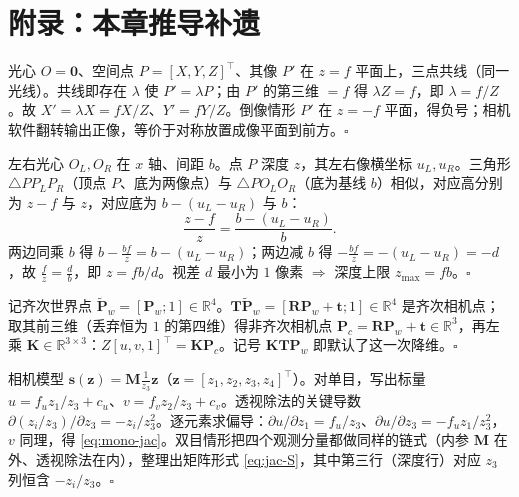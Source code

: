 \section*{附录：本章推导补遗}
\label{sec:cam-appendix}

\begin{derivation}
光心 $O=\mathbf{0}$、空间点 $P=[X,Y,Z]^\top$、其像 $P'$ 在 $z=f$ 平面上，三点共线（同一光线）。共线即存在 $\lambda$ 使 $P'=\lambda P$；由 $P'$ 的第三维 $=f$ 得 $\lambda Z=f$，即 $\lambda=f/Z$。故 $X'=\lambda X=fX/Z$、$Y'=fY/Z$。倒像情形 $P'$ 在 $z=-f$ 平面，得负号；相机软件翻转输出正像，等价于对称放置成像平面到前方。\hfill$\square$
\end{derivation}

\begin{derivation}[双目深度 $z=fb/d$（\cref{thm:stereo}）]
左右光心 $O_L,O_R$ 在 $x$ 轴、间距 $b$。点 $P$ 深度 $z$，其左右像横坐标 $u_L,u_R$。三角形 $\triangle PP_LP_R$（顶点 $P$、底为两像点）与 $\triangle PO_LO_R$（底为基线 $b$）相似，对应高分别为 $z-f$ 与 $z$，对应底为 $b-(u_L-u_R)$ 与 $b$：
\[
  \frac{z-f}{z}=\frac{b-(u_L-u_R)}{b}.
\]
两边同乘 $b$ 得 $b-\tfrac{bf}{z}=b-(u_L-u_R)$；两边减 $b$ 得 $-\tfrac{bf}{z}=-(u_L-u_R)=-d$，故 $\tfrac{f}{z}=\tfrac{d}{b}$，即 $z=fb/d$。视差 $d$ 最小为 $1$ 像素 $\Rightarrow$ 深度上限 $z_{\max}=fb$。\hfill$\square$
\end{derivation}

\begin{derivation}
记齐次世界点 $\tilde{\mathbf{P}}_w=[\mathbf{P}_w;1]\in\mathbb{R}^4$。$\mathbf{T}\tilde{\mathbf{P}}_w=[\mathbf{R}\mathbf{P}_w+\mathbf{t};1]\in\mathbb{R}^4$ 是齐次相机点；取其前三维（丢弃恒为 $1$ 的第四维）得非齐次相机点 $\mathbf{P}_c=\mathbf{R}\mathbf{P}_w+\mathbf{t}\in\mathbb{R}^3$，再左乘 $\mathbf{K}\in\mathbb{R}^{3\times3}$：$Z[u,v,1]^\top=\mathbf{K}\mathbf{P}_c$。记号 $\mathbf{K}\mathbf{T}\mathbf{P}_w$ 即默认了这一次降维。\hfill$\square$
\end{derivation}

\begin{derivation}
相机模型 $\mathbf{s}(\mathbf{z})=\mathbf{M}\tfrac1{z_3}\mathbf{z}$（$\mathbf{z}=[z_1,z_2,z_3,z_4]^\top$）。对单目，写出标量 $u=f_u z_1/z_3+c_u$、$v=f_v z_2/z_3+c_v$。透视除法的关键导数 $\partial(z_i/z_3)/\partial z_3=-z_i/z_3^2$。逐元素求偏导：$\partial u/\partial z_1=f_u/z_3$、$\partial u/\partial z_3=-f_u z_1/z_3^2$，$v$ 同理，得 \cref{eq:mono-jac}。双目情形把四个观测分量都做同样的链式（内参 $\mathbf{M}$ 在外、透视除法在内），整理出矩阵形式 \cref{eq:jac-S}，其中第三行（深度行）对应 $z_3$ 列恒含 $-z_i/z_3$。\hfill$\square$
\end{derivation}

